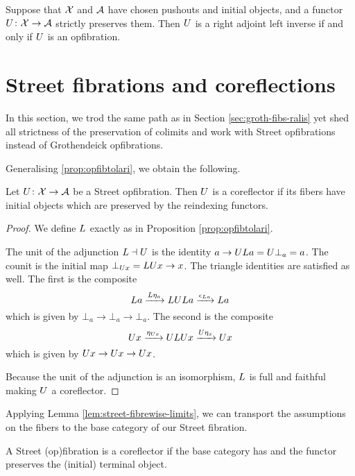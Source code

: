\documentclass{amsart}
\begin{document}
\begin{thm}\label{thm:mainthm}
Suppose that $\mathcal{X}$ and $\mathcal{A}$ have chosen pushouts and initial objects, and a functor $U\colon\mathcal{X}\to\mathcal{A}$ strictly preserves them. Then $U$ is a right adjoint left inverse if and only if $U$ is an opfibration.
\end{thm}

\section{Street fibrations and coreflections}\label{Streetfibs}

In this section, we trod the same path as in Section
\ref{sec:groth-fibs-ralis} yet shed all strictness of the
preservation of colimits and work with Street opfibrations
instead of Grothendeick opfibrations.

Generalising \cref{prop:opfibtolari}, we obtain
the following. 

\begin{prop}
  \label{thm:street-opfib-to-corefl}
  Let $ U \colon \mathcal{X} \to \mathcal{A} $ be a Street
  opfibration. Then $ U $ is a coreflector if its
  fibers have initial objects which are preserved
  by the reindexing functors.
\end{prop}

\begin{proof}
  We define $ L $ exactly as in Proposition
  \ref{prop:opfibtolari}. 

  The unit of the adjunction $ L \dashv U $ is the
  identity $ a\to UL a = U\bot_a = a $.  The
  counit is the initial map $ \bot_{U x} = LU x \to
  x $.  The triangle identities are satisfied as
  well. The first is the composite
  \[
    L a
    \xrightarrow{L\eta_a}        LUL a
    \xrightarrow{\epsilon_{L a}} L a
  \]
  which is given by $ \bot_a \to \bot_a \to \bot_a
  $.  The second is the composite
  \[
    U x
    \xrightarrow{\eta_{U x}} ULU x
    \xrightarrow{U\eta_x}    U x
  \]
  which is given by $ U x \to U x \to U x $.

  Because the unit of the adjunction is an
  isomorphism, $ L $ is full and faithful
  \cite[{Prop.~1.3}]{gabrielzisman} making $ U $ a
  coreflector.
\end{proof}

Applying Lemma \ref{lem:street-fibrewise-limits}, we can
transport the assumptions on the fibers to the base category
of our Street fibration.

\begin{cor}
  A Street (op)fibration is a coreflector if the base
  category has and the functor preserves the (initial)
  terminal object.
\end{cor}
\end{document}
